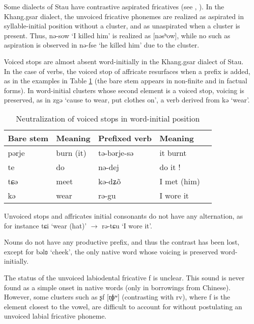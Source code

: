 \documentclass[oneside,a4paper,11pt]{article}
\newcommand{\ipa}[1]{{\phon #1}} %
\begin{document}
Some dialects of Stau have contrastive aspirated fricatives (see \citealt{jackson00puxi},  \citealt{jacques11lingua}). In the Khang.gsar dialect, the unvoiced fricative phonemes are realized as aspirated in syllable-initial position without a cluster, and as unaspirated when a cluster is present. Thus, \ipa{nə-sow} `I killed him' is realized as [nəsʰow], while no such as aspiration is observed in \ipa{nə-fse} `he killed him' due to the cluster.

Voiced stops are almost absent word-initially in the Khang.gsar dialect of Stau. In the case of verbs, the voiced stop of affricate resurfaces when a prefix is added, as in the examples in Table \ref{tab:voiced} (the bare stem appears in non-finite and in factual forms). In word-initial clusters whose second element is a voiced stop, voicing is preserved, as in \ipa{zgə} `cause to wear, put clothes on', a verb derived from \ipa{kə} `wear'. 

 \begin{table}[H]
 \caption{Neutralization of voiced stops in word-initial position} \label{tab:voiced} \centering 
\begin{tabular}{lllll}
\toprule
Bare stem & Meaning & Prefixed verb & Meaning \\
\midrule
\ipa{pərje} & burn (it) &\ipa{tə-bərje-sə} & it burnt \\
\ipa{te} & do &\ipa{nə-dej} & do it !\\
\ipa{tɕə} & meet &\ipa{kə-dʑõ} & I met (him)\\
\ipa{kə} &wear &\ipa{rə-gu} & I wore it \\
\bottomrule
\end{tabular}
\end{table}
Unvoiced stops and affricates initial consonants do not have any alternation, as for instance \ipa{tɕi} `wear (hat)' $\rightarrow$ \ipa{rə-tɕu} `I wore it'.

Nouns do not have any productive prefix, and thus the contrast has been lost, except for   \ipa{bəlʚ} `cheek', the only native word whose voicing is preserved word-initially.

 
The status of the unvoiced labiodental fricative \ipa{f} is unclear. This sound is never found as a simple onset in native words (only in borrowings from Chinese). However, some clusters such as  \ipa{ʂf} [\ipa{r̥ɸʷ}] (contrasting with \ipa{rv}), where \ipa{f} is the element closest to the vowel, are difficult to account for without postulating an unvoiced labial fricative phoneme.
 
\end{document}
